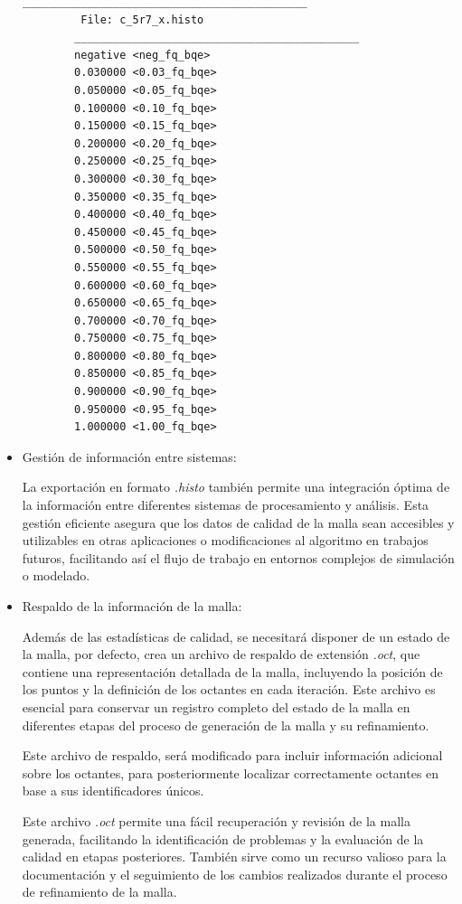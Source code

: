 \begin{itemize}
		
		\begin{lstlisting}[style=TxtStyle,caption={Estructura de archivo con extensión \textit{.histo} que contiene un histograma con estadísticas de elementos $J_{ENS}$ de la malla de la iteración actual.\\ Fuente: Elaboración propia.},label={code:jens_histo_c_5r7_0}]
		____________________________________________
		 File: c_5r7_x.histo 
		____________________________________________
		negative <neg_fq_bqe>
		0.030000 <0.03_fq_bqe>
		0.050000 <0.05_fq_bqe>
		0.100000 <0.10_fq_bqe>
		0.150000 <0.15_fq_bqe>
		0.200000 <0.20_fq_bqe>
		0.250000 <0.25_fq_bqe>
		0.300000 <0.30_fq_bqe>
		0.350000 <0.35_fq_bqe>
		0.400000 <0.40_fq_bqe>
		0.450000 <0.45_fq_bqe>
		0.500000 <0.50_fq_bqe>
		0.550000 <0.55_fq_bqe>
		0.600000 <0.60_fq_bqe>
		0.650000 <0.65_fq_bqe>
		0.700000 <0.70_fq_bqe>
		0.750000 <0.75_fq_bqe>
		0.800000 <0.80_fq_bqe>
		0.850000 <0.85_fq_bqe>
		0.900000 <0.90_fq_bqe>
		0.950000 <0.95_fq_bqe>
		1.000000 <1.00_fq_bqe>
		\end{lstlisting}
		
	  \item Gestión de información entre sistemas:
		
	  La exportación en formato \textit{.histo} también permite una integración óptima de la información entre diferentes sistemas de procesamiento y análisis.
	  Esta gestión eficiente asegura que los datos de calidad de la malla sean accesibles y utilizables en otras aplicaciones o modificaciones al algoritmo en trabajos futuros, facilitando así el flujo de trabajo en entornos complejos de simulación o modelado.
	  
	  \item Respaldo de la información de la malla:
	  
	  Además de las estadísticas de calidad, se necesitará disponer de un estado de la malla, por defecto, \mesher{} crea un archivo de respaldo de extensión \textit{.oct}, que contiene una representación detallada de la malla, incluyendo la posición de los puntos y la definición de los octantes en cada iteración.
	  Este archivo es esencial para conservar un registro completo del estado de la malla en diferentes etapas del proceso de generación de la malla y su refinamiento.
		
	  Este archivo de respaldo, será modificado para incluir información adicional sobre los octantes, para posteriormente localizar correctamente octantes en base a sus identificadores únicos.
	  
	  Este archivo \textit{.oct} permite una fácil recuperación y revisión de la malla generada, facilitando la identificación de problemas y la evaluación de la calidad en etapas posteriores.
	  También sirve como un recurso valioso para la documentación y el seguimiento de los cambios realizados durante el proceso de refinamiento de la malla.
		\end{itemize}
    





